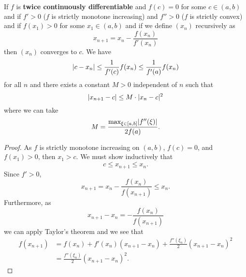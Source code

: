 \begin{theorem}
    If $f$ is \textbf{twice continuously differentiable} and $f(c) = 0$ for some $c \in (a, b)$ and if $f' > 0$ ($f$ is strictly monotone increasing) and $f'' > 0$ ($f$ is strictly convex) and if $f(x_1) > 0$ for some $x_1 \in (a, b)$ and if we define $(x_n)$ recursively as \[ x_{n + 1} = x_n - \frac{f(x_n)}{f'(x_n)} \] then $(x_n)$ converges to $c$. We have \[ \lvert c - x_n\rvert \leq \frac{1}{f'(c)} f(x_n) \leq \frac{1}{f'(a)} f(x_n) \] for all $n$ and there exists a constant $M > 0$ independent of $n$ such that \[ \lvert x_{n + 1} - c\rvert \leq M \cdot \lvert x_n - c\rvert^2 \] where we can take \[ M = \frac{\max_{\xi \in [a, b]} \lvert f''(\xi)\rvert}{2f(a)}. \]
\end{theorem}

\begin{proof}
    As $f$ is strictly monotone increasing on $(a, b)$, $f(c) = 0$, and $f(x_1) > 0$, then $x_1 > c$. We must show inductively that \[ c \leq x_{n + 1} \leq x_n. \] Since $f' > 0$, \[ x_{n + 1} = x_n - \frac{f(x_n)}{f(x_{n + 1})} \leq x_n. \] Furthermore, as \[ x_{n + 1} - x_n = - \frac{f(x_n)}{f(x_{n + 1})} \] we can apply Taylor's theorem and we see that 
    \begin{align*}
        f(x_{n + 1}) &= f(x_n) + f'(x_n) (x_{n + 1} - x_n) + \frac{f''(\xi_n)}{2} (x_{n + 1} - x_n)^2 \\
        &= \frac{f''(\xi_n)}{2} (x_{n + 1} - x_n)^2.
    \end{align*}
    
\end{proof}
